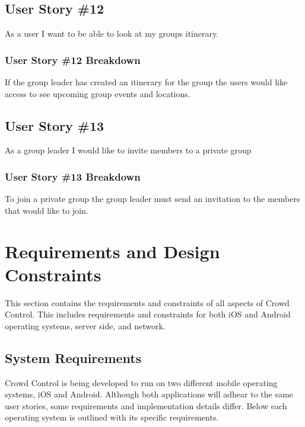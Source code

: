 \subsection{User Story \#12}
As a user I want to be able to look at my groups itinerary.
\subsubsection{User Story \#12 Breakdown}
If the group leader has created an itinerary for the group the users would like access to see upcoming group events and locations.

\subsection{User Story \#13}
As a group leader I would like to invite members to a private group
\subsubsection{User Story \#13 Breakdown}
To join a private group the group leader must send an invitation to the members that would like to join. 

\section{Requirements and Design Constraints}

This section contains the requirements and constraints of all aspects of Crowd Control.  This includes requirements and constraints for both iOS and Android operating systems, server side, and network.


\subsection{System Requirements}

Crowd Control is being developed to run on two different mobile operating systems, iOS and Android.  Although both applications will adhear to the same user stories, some requirements and implementation details differ.  Below each operating system is outlined with its specific requirements.

